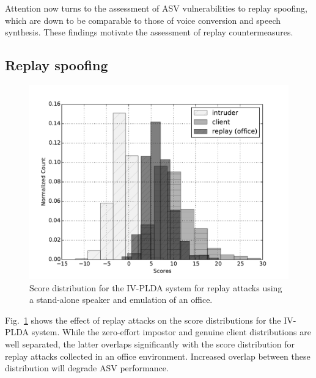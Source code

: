 
Attention now turns to the assessment of ASV vulnerabilities to replay spoofing, which are down to be comparable to those of voice conversion and speech synthesis.  These findings motivate the assessment of replay countermeasures.


\subsection{Replay spoofing}


\begin{figure}
	\centering
	\includegraphics[width=1\linewidth]{Figs/dist_IV_off.pdf}
	\caption{Score distribution for the IV-PLDA system for replay attacks using a stand-alone speaker and emulation of an office.}
	\label{fig::Dist_IV}
\end{figure}


Fig.~\ref{fig::Dist_IV} shows the effect of replay attacks on the score distributions for the IV-PLDA system.  While the zero-effort impostor and genuine client distributions are well separated, the latter overlaps significantly with the score distribution for replay attacks collected in an office environment.  Increased overlap between these distribution will degrade ASV performance.


